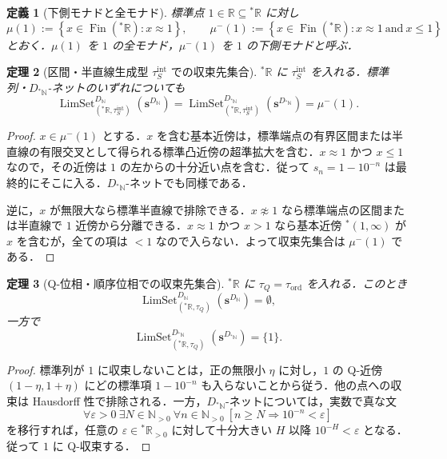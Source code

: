 \documentclass[a4paper,11pt]{ltjsarticle}
\theoremstyle{jpdef}
\newtheorem{definition}{定義}[section]
\theoremstyle{jpthm}
\newtheorem{theorem}[definition]{定理}
\newcommand{\N}{\mathbb{N}}
\newcommand{\R}{\mathbb{R}}
\newcommand{\LimSet}{\operatorname{LimSet}}
\newcommand{\Fin}{\operatorname{Fin}}
\newcommand{\Ns}{\N_{>0}}
\newcommand{\DN}{D_{\N}}
\newcommand{\DStarN}{D_{{}^{\ast}\N}}
\newcommand{\set}[1]{\left\{#1\right\}}
\newcommand{\ulim}[1]{{}^{\ast}#1}
\newcommand{\tauintS}{\tau^{\mathrm{int}}_{S}}
\newcommand{\tauQ}{\tau_{Q}}
\newcommand{\tauord}{\tau_{\mathrm{ord}}}
\newcommand{\eps}{\varepsilon}
\begin{document}
\begin{definition}[下側モナドと全モナド]
標準点 \(1\in\R\subseteq\ulim\R\) に対し
\[
  \mu(1):=\set{x\in\Fin(\ulim\R):x\approx1},
  \qquad
  \mu^-(1):=\set{x\in\Fin(\ulim\R):x\approx1\ \text{and}\ x\le1}
\]
とおく．\(\mu(1)\) を \(1\) の全モナド，\(\mu^-(1)\) を \(1\) の下側モナドと呼ぶ．
\end{definition}

\begin{theorem}[区間・半直線生成型 \(\tauintS\) での収束先集合]
\(\ulim\R\) に \(\tauintS\) を入れる．標準列・\(\DStarN\)-ネットのいずれについても
\[
  \LimSet^{\DN}_{(\ulim\R,\tauintS)}(\mathbf s^{\DN})
  =
  \LimSet^{\DStarN}_{(\ulim\R,\tauintS)}(\mathbf s^{\DStarN})
  =\mu^-(1).
\]
\end{theorem}

\begin{proof}
\(x\in\mu^-(1)\) とする．\(x\) を含む基本近傍は，標準端点の有界区間または半直線の有限交叉として得られる標準凸近傍の超準拡大を含む．\(x\approx1\) かつ \(x\le1\) なので，その近傍は \(1\) の左からの十分近い点を含む．従って \(s_n=1-10^{-n}\) は最終的にそこに入る．\(\DStarN\)-ネットでも同様である．

逆に，\(x\) が無限大なら標準半直線で排除できる．\(x\not\approx1\) なら標準端点の区間または半直線で \(1\) 近傍から分離できる．\(x\approx1\) かつ \(x>1\) なら基本近傍 \(\ulim(1,\infty)\) が \(x\) を含むが，全ての項は \(<1\) なので入らない．よって収束先集合は \(\mu^-(1)\) である．
\end{proof}

\begin{theorem}[Q-位相・順序位相での収束先集合]
\(\ulim\R\) に \(\tauQ=\tauord\) を入れる．このとき
\[
  \LimSet^{\DN}_{(\ulim\R,\tauQ)}(\mathbf s^{\DN})=\emptyset,
\]
一方で
\[
  \LimSet^{\DStarN}_{(\ulim\R,\tauQ)}(\mathbf s^{\DStarN})=\{1\}.
\]
\end{theorem}

\begin{proof}
標準列が \(1\) に収束しないことは，正の無限小 \(\eta\) に対し，\(1\) の Q-近傍 \((1-\eta,1+\eta)\) にどの標準項 \(1-10^{-n}\) も入らないことから従う．他の点への収束は Hausdorff 性で排除される．一方，\(\DStarN\)-ネットについては，実数で真な文
\[
  \forall\eps>0\ \exists N\in\Ns\ \forall n\in\Ns\ [n\ge N\Rightarrow10^{-n}<\eps]
\]
を移行すれば，任意の \(\eps\in\ulim\R_{>0}\) に対して十分大きい \(H\) 以降 \(10^{-H}<\eps\) となる．従って \(1\) に Q-収束する．
\end{proof}
\end{document}
